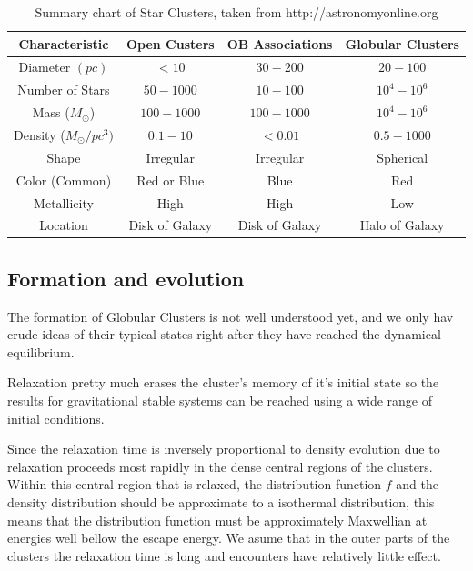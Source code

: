 \begin{table}[H]
\begin{tabular}{| c | c | c | c |}
\hline
\textbf{Characteristic}              & \textbf{Open Custers} & \textbf{OB Associations} & \textbf{Globular Clusters}  \\
\hline
Diameter $ (pc) $ & $<10$ & $30-200$ & $20-100$ \\ \hline
Number of Stars & $50-1000$ & $10-100$ & $10^{4}-10^{6}$ \\ \hline
Mass ($M_{\odot}$) & $100-1000$ & $100-1000$ & $10^{4}-10^{6}$ \\ \hline
Density ($M_{\odot}/pc^{3})$ & $0.1-10$ & $<0.01$ & $0.5-1000$ \\ \hline
Shape & Irregular & Irregular & Spherical \\ \hline
Color (Common) & Red or Blue & Blue & Red \\ \hline
Metallicity & High & High & Low \\ \hline
Location & Disk of Galaxy & Disk of Galaxy & Halo of Galaxy \\
\hline
\end{tabular}
\caption[Summary chart of Star Clusters]{Summary chart of Star Clusters, taken from  http://astronomyonline.org}
\end{table}

\subsection{Formation and evolution}

The formation of Globular Clusters is not well understood yet, and we only hav crude ideas of their typical states right after they have reached the dynamical equilibrium.

Relaxation pretty much erases the cluster's memory of it's initial state so the results for gravitational stable systems can be reached using a wide range of initial conditions.

Since the relaxation time is inversely proportional to density evolution due to relaxation proceeds most rapidly in the dense central regions of the clusters. Within this central region that is relaxed, the distribution function $f$ and the density distribution should be approximate to a isothermal distribution, this means that the distribution function must be approximately Maxwellian at energies well bellow the escape energy. We asume that in the outer parts of the clusters the relaxation time is long and encounters have relatively little effect.

